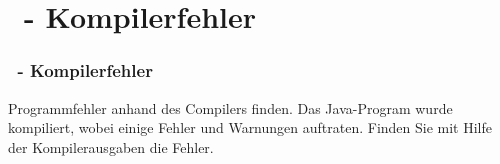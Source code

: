 \def\stitle{\theexercise\ - Kompilerfehler}
\section{\stitle}

\begin{frame}[t]%
\frametitle{\stitle}
\medskip
Programmfehler anhand des Compilers finden.
\newline
Das Java-Program  wurde kompiliert, wobei einige Fehler und Warnungen auftraten.
Finden Sie mit Hilfe der Kompilerausgaben die Fehler.

\end{frame}

